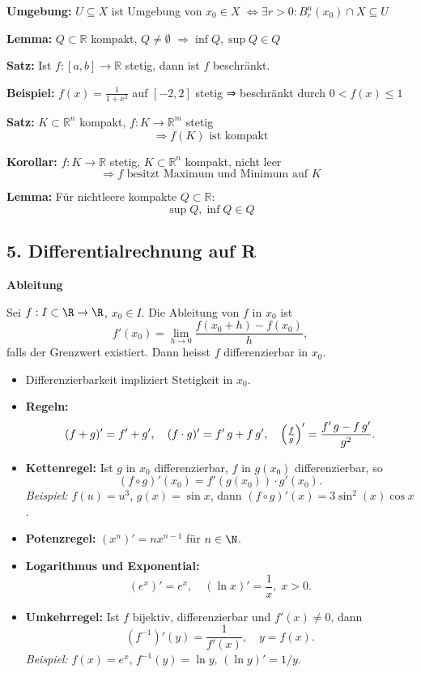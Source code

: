 \begin{itemize}
\textbf{Umgebung:}  
\(U \subseteq X\) ist Umgebung von \(x_0 \in X\)  
\(\Leftrightarrow \exists r > 0: B_r^n(x_0) \cap X \subseteq U\)

\textbf{Lemma:}  
\(Q \subset \mathbb{R}\) kompakt, \(Q \ne \emptyset\)  
\(\Rightarrow \inf Q, \sup Q \in Q\)

\textbf{Satz:}  
Ist \( f: [a,b] \to \mathbb{R} \) stetig, dann ist \( f \) beschränkt.

\textbf{Beispiel:}  
\( f(x) = \frac{1}{1 + x^2} \) auf \( [-2, 2] \) stetig ⇒ beschränkt durch \( 0 < f(x) \leq 1 \)

\textbf{Satz:}  
\( K \subset \mathbb{R}^n \) kompakt,\; \( f: K \to \mathbb{R}^m \) stetig  
\[
\Rightarrow f(K) \text{ ist kompakt}
\]


\textbf{Korollar:}  
\( f: K \to \mathbb{R} \) stetig, \( K \subset \mathbb{R}^n \) kompakt, nicht leer  
\[
\Rightarrow f \text{ besitzt Maximum und Minimum auf } K
\]


\textbf{Lemma:}  
Für nichtleere kompakte \( Q \subset \mathbb{R} \):  
\[
\sup Q, \inf Q \in Q
\]

\subsection{5. Differentialrechnung auf R}
\textbf{Ableitung}
\begin{definition}
  Sei $f:I\subset\R\to\R$, $x_0\in I$. Die Ableitung von $f$ in $x_0$ ist
  \[
    f'(x_0) = \lim_{h\to0} \frac{f(x_0 + h) - f(x_0)}{h},
  \]
  falls der Grenzwert existiert. Dann heisst $f$ differenzierbar in $x_0$.
\end{definition}
\begin{itemize}
  \item Differenzierbarkeit impliziert Stetigkeit in $x_0$.
  \item \textbf{Regeln:}
    \[
      (f+g)' = f' + g', \quad 
      (f\cdot g)' = f'\,g + f\,g', \quad
      \Bigl(\tfrac{f}{g}\Bigr)' = \frac{f'\,g - f\,g'}{g^2}.
    \]
  \item \textbf{Kettenregel:} Ist $g$ in $x_0$ differenzierbar, $f$ in $g(x_0)$ differenzierbar, so
    \[
      (f\circ g)'(x_0) = f'(g(x_0)) \cdot g'(x_0).
    \]
    \emph{Beispiel:} $f(u)=u^3$, $g(x)=\sin x$, dann $(f\circ g)'(x)=3\sin^2(x)\cos x$.
  \item \textbf{Potenzregel:} $(x^n)' = n x^{n-1}$ für $n\in\N$.
  \item \textbf{Logarithmus und Exponential:}  
    \[
      (e^x)' = e^x,\quad (\ln x)' = \frac{1}{x},\; x>0.
    \]
  \item \textbf{Umkehrregel:} Ist $f$ bijektiv, differenzierbar und $f'(x)\ne0$, dann
    \[
      (f^{-1})'(y) = \frac{1}{f'(x)},\quad y = f(x).
    \]
    \emph{Beispiel:} $f(x)=e^x$, $f^{-1}(y)=\ln y$, $(\ln y)' = 1/y$.
\end{itemize}


\end{itemize}
